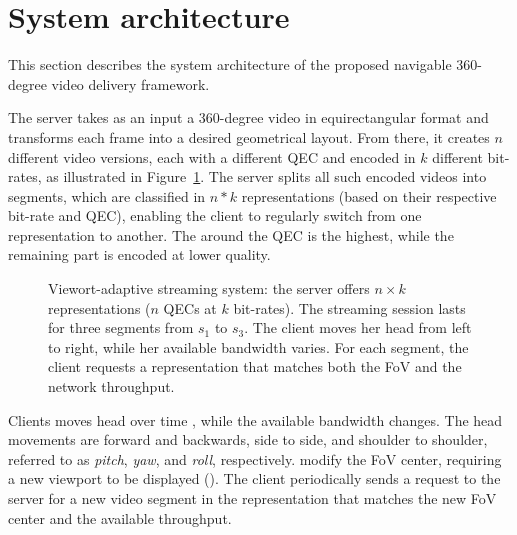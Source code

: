 \section{System architecture}

This section describes the system architecture of the proposed
navigable 360-degree video delivery framework.

 The server takes as an input a 360-degree video in
equirectangular format and transforms each frame into a desired
geometrical layout. From there, it creates $n$ different video
versions, each with a different QEC and encoded in $k$ different
bit-rates, as illustrated in Figure~\ref{fig:newdelivery}. The server
splits all such encoded videos into segments, which are
classified in $n\!*\!k$ representations (based on their respective bit-rate
and QEC), enabling the client to regularly switch from one
representation to another. The  around the QEC
is the highest, while the remaining part is encoded at lower quality.

\begin{figure}
   \centering
   
   \caption{Viewort-adaptive streaming system: the server offers $n\times k$ representations ($n$ \acp{QEC} at $k$ bit-rates). The streaming session lasts for three segments from $s_1$ to $s_3$. The client moves her head from left to right, while her available bandwidth varies. For each segment, the client requests a representation that matches both the \ac{FoV} and the network throughput.}
   \label{fig:newdelivery}
\end{figure}

Clients moves  head over time , 
while the
available bandwidth changes. The head movements are forward
and backwards, side to side, and shoulder to shoulder, referred to as
\emph{pitch}, \emph{yaw}, and \emph{roll}, respectively. 
modify the FoV center, requiring a new viewport
to be displayed ().
The client periodically
sends a request to the server for a new video segment in the
representation that matches  the new FoV center and the available
throughput.

